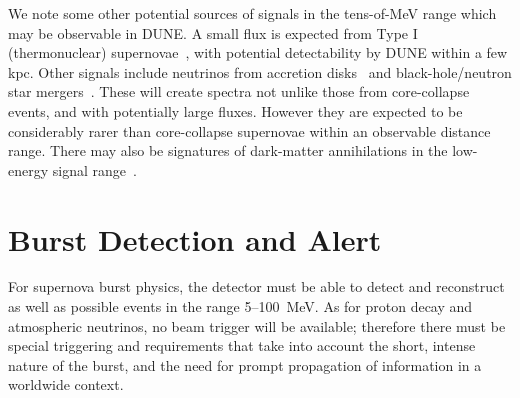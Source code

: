 We note some other potential sources of signals in the tens-of-MeV
range which may be observable in DUNE.  A small flux is expected from
Type I (thermonuclear) supernovae~\cite{Wright:2016gar,
  Wright:2016xma}, with potential detectability by DUNE within a few
kpc.   Other signals include neutrinos from accretion disks~\cite{Caballero:2011dw} and black-hole/neutron star mergers~\cite{Caballero:2009ww}.  These will create spectra not unlike those from core-collapse events, and with potentially large fluxes.  However they are expected to be considerably rarer than core-collapse supernovae within an observable distance range.  There may also be signatures of dark-matter  annihilations in the low-energy signal range~\cite{Rott:2012qb, Bernal:2012qh}.


\section{Burst Detection and Alert}
\label{sec:physics-snblowe-detector-requirements}

For supernova burst physics, the detector must be able to detect and
reconstruct as well as possible events in the range 5--100~MeV.  As
for proton decay and atmospheric neutrinos, no beam trigger will be
available; therefore there must be special triggering and 
requirements that take into account the short, intense nature of the
burst, and the need for prompt propagation of information in a
worldwide context.





